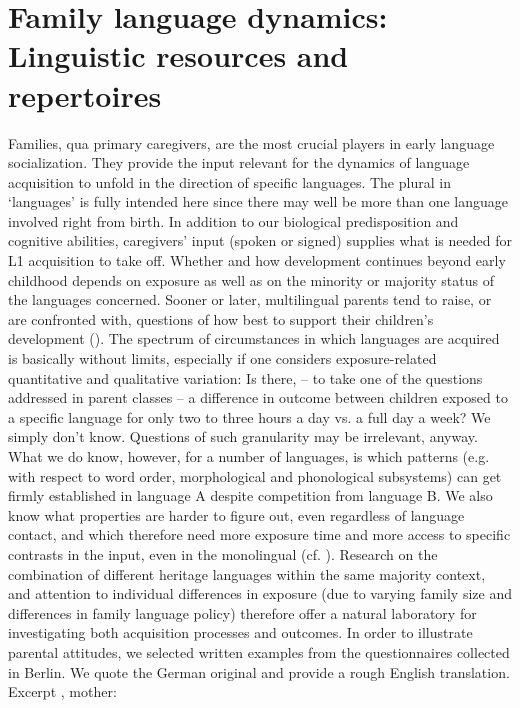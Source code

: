\documentclass[output=paper,colorlinks,citecolor=brown]{langscibook}
\begin{document}
\section{Family language dynamics: Linguistic resources and repertoires} \label{sec:purkathoferetal:4}

Families, qua primary caregivers, are the most crucial players in early language socialization. They provide the input relevant for the dynamics of language acquisition to unfold in the direction of specific languages. The plural in ‘languages’ is fully intended here since there may well be more than one language involved right from birth. In addition to our biological predisposition and cognitive abilities, caregivers’ input (spoken or signed) supplies what is needed for L1 acquisition to take off. Whether and how development continues beyond early childhood depends on exposure as well as on the minority or majority status of the languages concerned.
Sooner or later, multilingual parents tend to raise, or are confronted with, questions of how best to support their children’s development (\cite{Lanza2004}). The spectrum of circumstances in which languages are acquired is basically without limits, especially if one considers exposure-related quantitative and qualitative variation: Is there, – to take one of the questions addressed in parent classes – a difference in outcome between children exposed to a specific language for only two to three hours a day vs. a full day a week? We simply don’t know. Questions of such granularity may be irrelevant, anyway. What we do know, however, for a number of languages, is which patterns (e.g. with respect to word order, morphological and phonological subsystems) can get firmly established in language A despite competition from language B. We also know what properties are harder to figure out, even regardless of language contact, and which therefore need more exposure time and more access to specific contrasts in the input, even in the monolingual (cf. \cite{Tsimpli2014, chapters/05}). Research on the combination of different heritage languages within the same majority context, and attention to individual differences in exposure (due to varying family size and differences in family language policy) therefore offer a natural laboratory for investigating both acquisition processes and outcomes.
In order to illustrate parental attitudes, we selected written examples from the questionnaires collected in Berlin. We quote the German original and provide a rough English translation.
Excerpt , mother:
\end{document}
